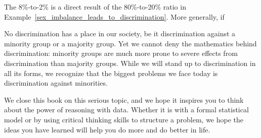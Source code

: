 The 8\%-to-2\% is a direct result of the 80\%-to-20\% ratio
in Example~\ref{sex_imbalance_leads_to_discrimination}.
More generally, if 

No discrimination has a place in our society,
be it discrimination against a minority group
or a majority group.
Yet we cannot deny the mathematics behind
discrimination: minority groups are much more
prone to severe effects from discrimination
than majority groups.
While we will stand up to discrimination in all
its forms, we recognize that the biggest problems
we face today is discrimination against minorities.

We close this book on this serious topic,
and we hope it inspires you to think about
the power of reasoning with data.
Whether it is with a formal statistical model
or by using critical thinking skills to structure
a problem, we hope the ideas you have learned will
help you do more and do better in life.

